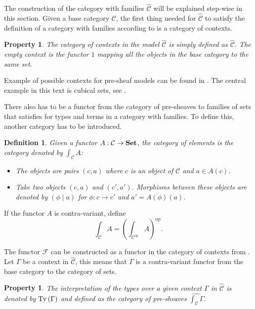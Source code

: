 \documentclass[12pt,a4paper,twoside,xetex]{book} %
\newcommand{\keyword}[1]{\emph{#1}\index{#1}}
\newtheorem{definition}[theorem]{Definition}
\newtheorem{property}[theorem]{Property}
\newcommand{\psh}[1]{\widehat{#1}}
\newcommand{\coe}[2]{\int_{#1}{#2}}
\begin{document}
The construction of the category with families $\psh{\mathcal{C}}$ will be explained step-wise in this section.
Given a base category $\mathcal{C}$, the first thing needed for $\psh{\mathcal{C}}$ to satisfy the definition of a 
category with families according to  is a category of contexts. 

\begin{property}\label{precon}
  The category of contexts in the model $\psh{\mathcal{C}}$ is simply defined as $\psh{\mathcal{C}}$. The empty context is 
the functor $1$ mapping all the objects in the base category to the same set. 
\end{property}

Example of possible contexts for pre-sheaf models can be found in . The central example in this text is cubical sets, see . 

There also has to be a functor from the category of pre-sheaves to families of 
sets that satisfies  for types and terms in a category with 
families. To define this, another category has to be introduced.

\begin{definition}\label{catel}
Given a functor $A:\mathcal{C} \rightarrow \text{\textbf{Set}}$, the \keyword{category of 
elements} is the category denoted by $\int_{\mathcal{C}} A$:

\begin{itemize}
\item The objects are pairs $(c,a)$ where $c$ is an object of $\mathcal{C}$ and 
$a\in A(c)$.
\item Take two objects $(c,a)$ and $(c',a')$. Morphisms between these objects 
are denoted by $(\phi \mid a)$ for $\phi : c \rightarrow c'$ and $a' = 
A(\phi)(a)$.
\end{itemize}
\end{definition}

If the functor $A$ is contra-variant, define $$\coe{\mathcal{C}}{A} = 
\left(\coe{\mathcal{C}^{\text{op}}}{A} \right)^{\text{op}}.$$

The functor $\mathcal{F}$ can be constructed as a functor in the category of 
contexts from . Let $\Gamma$ be a context in $\psh{\mathcal{C}}$, this means that $\Gamma$ is a contra-variant functor from the base 
category to the category of sets. 

\begin{property}\label{prety}
The interpretation of the types over a given context $\Gamma$ in $\psh{\mathcal{C}}$ is denoted by $\text{Ty}\left(\Gamma\right)$ and defined as the category of pre-sheaves $\psh{\coe{\mathcal{C}}{\Gamma}}.$
\end{property}
\end{document}
